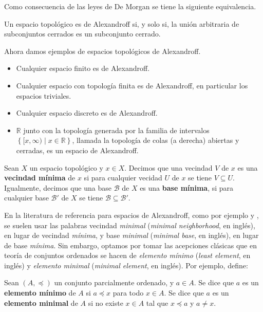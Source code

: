 Como consecuencia de las leyes de De Morgan se tiene la siguiente equivalencia.
\begin{Prop}\label{Prop:Uniones_cerrados_Alexandroff}
   Un espacio topológico es de Alexandroff si, y solo si, la unión arbitraria de subconjuntos cerrados es un subconjunto cerrado.
\end{Prop}
Ahora damos ejemplos de espacios topológicos de Alexandroff.
\begin{Ejm}
   \phantom{o}
   \begin{itemize}
      \item Cualquier espacio finito es de Alexandroff.
      \item Cualquier espacio con topología finita es de Alexandroff, en particular los espacios triviales.
      \item Cualquier espacio discreto es de Alexandroff.
      \item $\mathbb{R}$ junto con la topología generada por la familia de intervalos $\left\lbrace [x,\infty)\mid x\in \mathbb{R}\right\rbrace$, llamada la topología de colas (a derecha) abiertas y cerradas, es un espacio de Alexandroff.
   \end{itemize}
\end{Ejm}
\begin{Def}
   Sean $X$ un espacio topológico y $x\in X$. Decimos que una vecindad $V$ de $x$ es una \textbf{vecindad mínima} de $x$ si para cualquier vecidad $U$ de $x$ se tiene $V\subseteq U$. Igualmente, decimos que una base $\mathcal{B}$ de $X$ es una \textbf{base mínima}, si para cualquier base $\mathcal{B}'$ de $X$ se tiene $\mathcal{B}\subseteq\mathcal{B}'$.
\end{Def}
En la literatura de referencia para espacios de Alexandroff, como por ejemplo \cite{arenas1999} y \cite{speer2007}, se suelen usar las palabras vecindad \textit{minimal} (\textit{minimal neighborhood}, en inglés), en lugar de vecindad \textit{mínima}, y base \textit{minimal} (\textit{minimal base}, en inglés), en lugar de base \textit{mínima}. Sin embargo, optamos por tomar las acepciones clásicas que en teoría de conjuntos ordenados se hacen de \textit{elemento mínimo} (\textit{least element}, en inglés) y \textit{elemento minimal} (\textit{minimal element}, en inglés). Por ejemplo, \cite{bloch2011} define:
\begin{Def}
   Sean $(A,\preccurlyeq)$ un conjunto parcialmente ordenado, y $a\in A$. Se dice que $a$ es un \textbf{elemento mínimo} de $A$ si $a\preccurlyeq x$ para todo $x\in A$. Se dice que $a$ es un \textbf{elemento minimal} de $A$ si no existe $x\in A$ tal que $x\preccurlyeq a$ y $a\ne x$. 
\end{Def}
